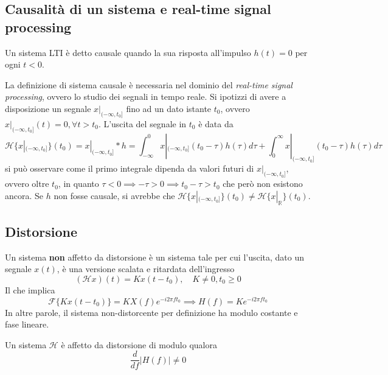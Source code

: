     \subsection{Causalità di un sistema e real-time signal processing}
        \begin{definition}
            Un sistema LTI è detto causale quando la sua risposta all'impulso $h(t) = 0$ per ogni $t < 0$.
        \end{definition}

        La definizione di sistema causale è necessaria nel dominio del \textit{real-time signal processing}, ovvero lo studio dei segnali in tempo reale.
        Si ipotizzi di avere a disposizione un segnale $x|_{(-\infty, t_0]}$ fino ad un dato istante $t_0$, ovvero $x|_{(-\infty, t_0]}(t) = 0, \forall t > t_0$. L'uscita del segnale in $t_0$ è data da
        \[
            \mathcal{H}\{x|_{(-\infty, t_0]}\}(t_0) = x|_{(-\infty, t_0]} * h = \int_{-\infty}^{0} x|_{(-\infty, t_0]}(t_0 - \tau) h(\tau) d\tau + \int_{0}^{\infty} x|_{(-\infty, t_0]}(t_0 - \tau) h(\tau) d\tau
        \]
        si può osservare come il primo integrale dipenda da valori futuri di $x|_{(-\infty, t_0]}$, ovvero oltre $t_0$, in quanto $\tau < 0 \implies - \tau > 0 \implies t_0 - \tau > t_0$ che però non esistono ancora.
        Se $h$ non fosse causale, si avrebbe che $\mathcal{H}\{x|_{(-\infty, t_0]}\}(t_0) \neq \mathcal{H}\{x|_{\mathbb{R}}\}(t_0)$.

    \subsection{Distorsione}
        Un sistema \textbf{non} affetto da distorsione è un sistema tale per cui l'uscita, dato un segnale $x(t)$, è una versione scalata e ritardata dell'ingresso
        \[
            (\mathcal{H} x)(t) = K x(t - t_0), \quad K \neq 0, t_0 \geq 0
        \]
        Il che implica
        \[
            \mathcal{F}\{ K x(t - t_0) \} = K X(f) e^{-i 2 \pi f t_0} \implies H(f) = K e^{-i 2 \pi f t_0}
        \]
        In altre parole, il sistema non-distorcente per definizione ha modulo costante e fase lineare.

        \begin{definition}
            Un sistema $\mathcal{H}$ è affetto da distorsione di modulo qualora
            \[
                \frac{d }{df} |H(f)| \neq 0 
            \]
        \end{definition}

